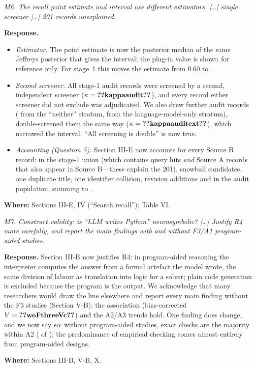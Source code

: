 \documentclass[10pt,a4paper]{article}
\newenvironment{referee}{\par\medskip\noindent\begin{minipage}{\linewidth}\color{black!65}\itshape}{\end{minipage}\par\smallskip}
\newcommand{\resp}{\noindent\textbf{Response.} }
\newcommand{\where}[1]{\par\noindent\textbf{Where:} #1\par}
\begin{document}
\begin{referee}M6. The recall point estimate and interval use different estimators. [\ldots] single screener [\ldots] 201 records unexplained.\end{referee}
\resp
\begin{itemize}
  \item \emph{Estimator.} The point estimate is now the posterior median of the same Jeffreys posterior that gives the interval; the plug-in value is shown for reference only. For stage~1 this moves the estimate from 0.60 to .
  \item \emph{Second screener.} All  stage-1 audit records were screened by a second, independent screener ($\kappa=\cnt{kappaaudit}$), and every record either screener did not exclude was adjudicated. We also drew  further audit records ( from the ``neither'' stratum,  from the language-model-only stratum), double-screened them the same way ($\kappa=\cnt{kappaauditext}$), which narrowed the interval. ``All screening is double'' is now true.
  \item \emph{Accounting (Question 5).} Section III-E now accounts for every Source B record:  in the stage-1 union (which contains query hits \emph{and} Source A records that also appear in Source B---these explain the 201),  snowball candidates, one duplicate title, one identifier collision,  revision additions and  in the audit population, summing to .
\end{itemize}
\where{Sections III-E, IV (``Search recall''); Table VI.}

\begin{referee}M7. Construct validity: is ``LLM writes Python'' neurosymbolic? [\ldots] Justify R4 more carefully, and report the main findings with and without F3/A1 program-aided studies.\end{referee}
\resp Section III-B now justifies R4: in program-aided reasoning the interpreter computes the answer from a formal artefact the model wrote, the same division of labour as translation into logic for a solver; plain code generation is excluded because the program is the output. We acknowledge that many researchers would draw the line elsewhere and report every main finding without the  F3 studies (Section V-B): the association (bias-corrected $V=\cnt{woFthreeVc}$) and the A2/A3 trends hold. One finding does change, and we now say so: without program-aided studies, exact checks are the majority within A2 ( of ); the predominance of empirical checking comes almost entirely from program-aided designs.
\where{Sections III-B, V-B, X.}
\end{document}
